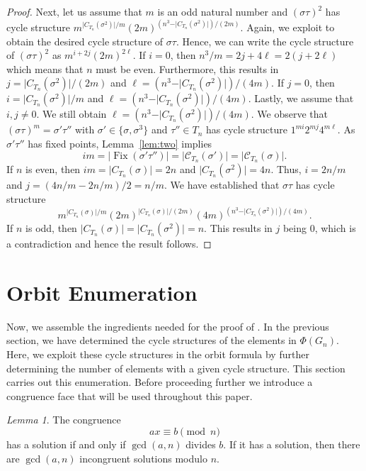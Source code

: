 \documentclass[12pt]{article}
\theoremstyle{definition}
\theoremstyle{remark}
\newtheorem{lemma}[theorem]{Lemma}
\DeclareMathOperator{\Fix}{Fix}
\newcommand{\C}{{\mathcal{C}}}
\begin{document}
\begin{proof}
Next, let us assume that $m$ is an odd natural number and $(\sigma\tau)^2$ has cycle structure $m^{\vert C_{T_n}(\sigma^2)\vert /m}(2m)^{(n^3-\vert C_{T_n}(\sigma^2)\vert )/(2m)}.$ Again, we exploit  to obtain the desired cycle structure of $\sigma \tau$.  Hence, we can write the cycle structure of $(\sigma\tau)^2$ as $m^{i+2j}(2m)^{2\ell}.$ If $i=0$, then $n^3/m=2j+4\ell=2(j+2\ell)$ which means that $n$ must be even. Furthermore, this results in $j=\vert C_{T_n}(\sigma^2)\vert /(2m)$ and $\ell =(n^3-\vert C_{T_n}(\sigma^2)\vert )/(4m).$ If $j=0$, then $i=\vert C_{T_n}(\sigma^2)\vert /m$ and $\ell =(n^3-\vert C_{T_n}(\sigma^2)\vert )/(4m)$.
Lastly, we assume that $i,j\neq 0$. We still obtain $\ell =(n^3-\vert C_{T_n}(\sigma^2)\vert )/(4m)$. We observe that $(\sigma\tau)^m=\sigma'\tau''$ with $\sigma'\in\{\sigma,\sigma^3 \}$ and $\tau''\in T_n$ has cycle structure $1^{mi}2^{mj}4^{m\ell}.$ As $\sigma'\tau''$ has fixed points, Lemma~\ref{lem:two} implies
 \[im=\vert \Fix(\sigma'\tau'')\vert = |\C_{T_n}(\sigma')\vert =\vert \C_{T_n}(\sigma)\vert .\]
 If $n$ is even, then
 $im = |C_{T_n}(\sigma)\vert =2n$ and $\vert C_{T_n}(\sigma^2)\vert =4n$. Thus,
 $i =2n/m$ and $j= (4n/m-2n/m)/2=n/m $. We have established that
$\sigma\tau$ has cycle structure $$m^{\vert C_{T_n}(\sigma) \vert/m} (2m)^{\vert C_{T_n}(\sigma) \vert/(2m)} (4m)^{(n^3-\vert C_{T_n}(\sigma^2)\vert )/(4m)}.$$ If $n$ is odd, then $\vert C_{T_n}(\sigma)\vert =\vert C_{T_n}(\sigma^2)\vert =n.$ This results in $j$ being $0$, which is a contradiction and hence the result follows.

\end{proof}

\section{Orbit Enumeration}
\label{counts}

Now, we assemble the ingredients needed for the proof of . In the previous section, we have determined the cycle structures of the elements in $\Phi(G_n).$
Here, we exploit these cycle structures in the orbit formula by further determining the number of elements with a given cycle structure.
This section carries out this enumeration.
Before proceeding further we introduce a congruence face that will be used throughout this paper.
\begin{lemma}\label{lem:solmodn}
The congruence
$$ax \equiv b \pmod{n}$$
has a solution if and only if $\gcd(a,n)$ divides $b$. If it has a solution, then there are $\gcd(a,n) $
incongruent solutions modulo $n$.
\end{lemma}
\end{document}
